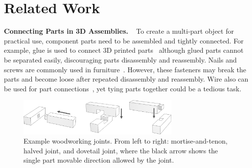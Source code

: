 

\section{Related Work}
\label{sec:related}



\vspace*{2.0mm}
\noindent
{\bf Connecting Parts in 3D Assemblies.}  \
To create a multi-part object for practical use,  component parts need to be assembled and tightly connected.
For example, glue is used to connect 3D printed parts~\cite{Chen-2015-Dapper,Vanek-2014-PackMerger, Hu-2014-Pyramidal}
although glued parts cannot be separated easily, discouraging parts disassembly and reassembly.
Nails and screws are commonly used in furniture~\cite{Shao-2016-Furniture,Lau-2011-Furniture}.
However, these fasteners may break the parts and become loose after repeated disassembly and reassembly.
Wire also can be used for  part connections~\cite{Attene-2015-ShapesInABox, Richter-2015-BeamMeshes}, yet tying parts together could be a tedious task.

\begin{figure}[!b]
	\centering
	\vspace*{-4.0mm}
	\includegraphics[width=8.00cm]{images/Joints.png}
	\vspace*{-2.5mm}
	\caption{Example woodworking joints. From left to right: mortise-and-tenon, halved joint, and dovetail joint, where the black arrow shows the single part movable direction allowed by the joint.}
	\label{fig:Joints}
\end{figure}


